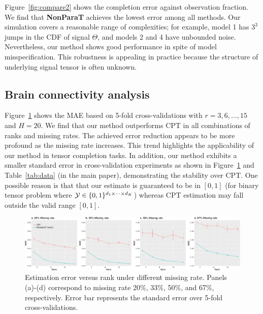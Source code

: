 \documentclass[11pt]{article}
\theoremstyle{plain}
\theoremstyle{definition}
\begin{document}
Figure~\ref{fig:compare2} shows the completion error against observation fraction.  We find that {\bf NonParaT} achieves the lowest error among all methods. Our simulation covers a reasonable range of  complexities; for example, model 1 has $3^3$ jumps in the CDF of signal $\Theta$, and models 2 and 4 have unbounded noise. Nevertheless, our method shows good performance in spite of model misspecification. This robustness is appealing in practice because the structure of underlying signal tensor is often unknown. 





\subsection{Brain connectivity analysis}
Figure~\ref{fig:braincv} shows the MAE based on 5-fold cross-validations with $r = 3,6,\ldots, 15$ and $H = 20$. We find that our method outperforms CPT in all combinations of ranks and missing rates. The achieved error reduction appears to be more profound as the missing rate increases. This trend highlights the applicability of our method in tensor completion tasks. In addition, our method exhibits a smaller standard error in cross-validation experiments as shown in Figure~\ref{fig:braincv} and Table~\ref{tab:data} (in the main paper), demonstrating the stability over CPT.  One possible reason is that that our estimate is guaranteed to be in $[0,1]$ (for binary tensor problem where $\mathcal{Y}\in\{0,1\}^{d_1\times\cdots\times d_K}$) whereas CPT estimation may fall outside the valid range $[0,1]$. 

\begin{figure}[h!]
\includegraphics[width = \textwidth]{figure/brain_sim.pdf}
\caption{Estimation error versus rank under different missing rate. Panels (a)-(d) correspond to missing rate 20\%, 33\%, 50\%, and 67\%, respectively. Error bar represents the standard error over 5-fold cross-validations.}\label{fig:braincv}
\end{figure}
\end{document}
